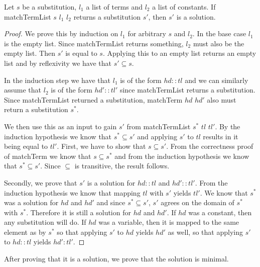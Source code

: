 \begin{lemma}[\matchTermListFindsSolution]
    Let $s$ be a substitution, $l_1$ a list of terms and $l_2$ a list of constants. If matchTermList $s$ $l_1$ $l_2$ returns a substitution $s'$, then $s'$ is a solution.
\end{lemma}
\begin{proof}
    We prove this by induction on $l_1$ for arbitrary $s$ and $l_2$.
    In the base case $l_1$ is the empty list. Since matchTermList returns something, $l_2$ must also be the empty list. Then $s'$ is equal to $s$. Applying this to an empty list returns an empty list and by reflexivity we have that $s' \subseteq s$.

    In the induction step we have that $l_1$ is of the form $hd::tl$ and we can similarly assume that $l_2$ is of the form $hd'::tl'$ since matchTermList returns a substitution. Since matchTermList returned a substitution, matchTerm $hd$ $hd'$ also must return a substitution $s^\ast$.

    We then use this as an input to gain $s'$ from matchTermList $s^\ast$ $tl$ $tl'$. By the induction hypothesis we know that $s^\ast \subseteq s'$ and applying $s'$ to $tl$ results in it being equal to $tl'$. 
    First, we have to show that $s \subseteq s'$. From the correctness proof of matchTerm we know that $s \subseteq s^\ast$ and from the induction hypothesis we know that $s^\ast \subseteq s'$. Since $\subseteq$ is transitive, the result follows.

    Secondly, we prove that $s'$ is a solution for $hd::tl$ and $hd'::tl'$. From the induction hypothesis we know that mapping $tl$ with $s'$ yields $tl'$. We know that $s^\ast$ was a solution for $hd$ and $hd'$ and since $s^\ast \subseteq s'$, $s'$ agrees on the domain of $s^\ast$ with $s^\ast$. Therefore it is still a solution for $hd$ and $hd'$. If $hd$ was a constant, then any substitution will do. If $hd$ was a variable, then it is mapped to the same element as by $s^\ast$ so that applying $s'$ to $hd$ yields $hd'$ as well, so that applying $s'$ to $hd::tl$ yields $hd':tl'$. 
\end{proof}

After proving that it is a solution, we prove that the solution is minimal.

